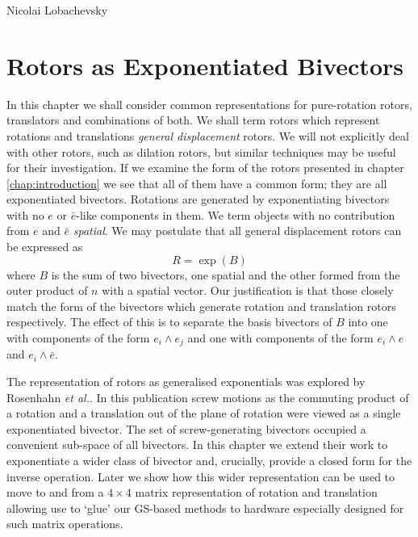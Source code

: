 \begin{savequote}
%
{Nicolai Lobachevsky}%
\end{savequote}

\chapter{Rotors as Exponentiated Bivectors}
\label{chap:exponential}

In this chapter we shall consider common representations for pure-rotation
rotors, translators and combinations of both. We shall term rotors which
represent rotations and translations \emph{general displacement} rotors. We
will not explicitly deal with other rotors, such as dilation rotors, but
similar techniques may be useful for their investigation.  If we examine the
form of the rotors presented in chapter \ref{chap:introduction} we see that
all of them have a common form; they are all exponentiated bivectors.
Rotations are generated by exponentiating bivectors with no
$e$ or $\bar{e}$-like components in them. We term objects with no contribution
from $e$ and $\bar{e}$ \emph{spatial}.
We may
postulate that all general displacement rotors can be expressed as
\[
R = \exp(B)
\]
where $B$ is the sum of two bivectors, one spatial and
the other formed from the outer product of
$n$ with a spatial vector. Our justification is that those closely match
the form of the bivectors which generate rotation and translation rotors 
respectively. The effect of this is to separate the basis bivectors of $B$
into one with components of the form $e_i \wedge e_j$ and one with components
of the form $e_i \wedge e$ and $e_i \wedge \bar{e}$.

The representation of rotors as generalised exponentials was explored by
Rosenhahn \emph{et al.}\cite{bodo-sommer,bodo1,bodo2}. In this publication screw motions as
the commuting product of a rotation and a translation out of the plane of
rotation were viewed as a single exponentiated bivector. The set of screw-generating
bivectors occupied a convenient sub-space of all bivectors. In this chapter we 
extend their work to exponentiate a wider class of bivector and, crucially, provide
a closed form for the inverse operation. Later we show how this wider representation
can be used to move to and from a $4 \times 4$ matrix representation of rotation
and translation allowing use to `glue' our GS-based methods to hardware especially designed
for such matrix operations.

